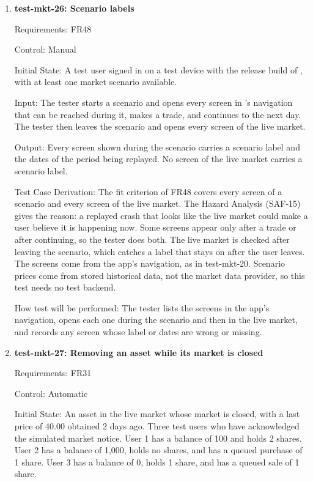 \documentclass[12pt, titlepage]{article}
\begin{document}
\begin{enumerate}
How test will be performed: A pytest test starts the scenario, sends each
request to continue, and reads the replayed date and A's price through the
API after each step.

\item{\textbf{test-mkt-26: Scenario labels}\\}

Requirements: FR48

Control: Manual

Initial State: A test user signed in on a test device with the release build
of \progname{}, with at least one market scenario available.

Input: The tester starts a scenario and opens every screen in \progname{}'s
navigation that can be reached during it, makes a trade, and continues to the
next day. The tester then leaves the scenario and opens every screen of the
live market.

Output: Every screen shown during the scenario carries a scenario label and
the dates of the period being replayed. No screen of the live market carries
a scenario label.

Test Case Derivation: The fit criterion of FR48 covers every screen of a
scenario and every screen of the live market. The Hazard Analysis (SAF-15)
gives the reason: a replayed crash that looks like the live market could make
a user believe it is happening now. Some screens appear only after a trade or
after continuing, so the tester does both. The live market is checked after
leaving the scenario, which catches a label that stays on after the user
leaves. The screens come from the app's navigation, as in test-mkt-20.
Scenario prices come from stored historical data, not the market data
provider, so this test needs no test backend.

How test will be performed: The tester lists the screens in the app's
navigation, opens each one during the scenario and then in the live market,
and records any screen whose label or dates are wrong or missing.

\item{\textbf{test-mkt-27: Removing an asset while its market is closed}\\}

Requirements: FR31

Control: Automatic

Initial State: An asset in the live market whose market is closed, with a last
price of 40.00 obtained 2 days ago. Three test users who have acknowledged the
simulated market notice. User 1 has a balance of 100 and holds 2 shares. User 2
has a balance of 1,000, holds no shares, and has a queued purchase of 1 share.
User 3 has a balance of 0, holds 1 share, and has a queued sale of 1 share.


\end{enumerate}
\end{document}
